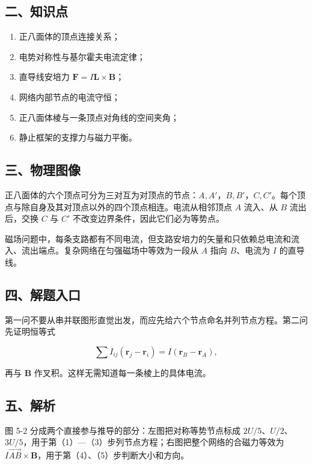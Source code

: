 \documentclass[12pt,a4paper,UTF8]{ctexart}
\newcommand{\tightlist}{\setlength{\itemsep}{0pt}\setlength{\parskip}{0pt}}
\begin{document}
\subsection{二、知识点}\label{ux4e8cux77e5ux8bc6ux70b9-4}

\begin{enumerate}
\def\labelenumi{\arabic{enumi}.}
\tightlist
\item
  正八面体的顶点连接关系；
\item
  电势对称性与基尔霍夫电流定律；
\item
  直导线安培力 \(\bm F=I\bm L\times\bm B\)；
\item
  网络内部节点的电流守恒；
\item
  正八面体棱与一条顶点对角线的空间夹角；
\item
  静止框架的支撑力与磁力平衡。
\end{enumerate}

\subsection{三、物理图像}\label{ux4e09ux7269ux7406ux56feux50cf-4}

正八面体的六个顶点可分为三对互为对顶点的节点：\(A,A'\)，\(B,B'\)，\(C,C'\)。每个顶点与除自身及其对顶点以外的四个顶点相连。电流从相邻顶点
\(A\) 流入、从 \(B\) 流出后，交换 \(C\) 与 \(C'\)
不改变边界条件，因此它们必为等势点。

磁场问题中，每条支路都有不同电流，但支路安培力的矢量和只依赖总电流和流入、流出端点。复杂网络在匀强磁场中等效为一段从
\(A\) 指向 \(B\)、电流为 \(I\) 的直导线。

\subsection{四、解题入口}\label{ux56dbux89e3ux9898ux5165ux53e3-4}

第一问不要从串并联图形直觉出发，而应先给六个节点命名并列节点方程。第二问先证明恒等式

\[
\sum I_{ij}(\bm r_j-\bm r_i)=I(\bm r_B-\bm r_A),
\]

再与 \(\bm B\) 作叉积。这样无需知道每一条棱上的具体电流。

\subsection{五、解析}\label{ux4e94ux89e3ux6790-4}

图 5-2 分成两个直接参与推导的部分：左图把对称等势节点标成
\(2U/5\)、\(U/2\)、\(3U/5\)，用于第（1）---（3）步列节点方程；右图把整个网络的合磁力等效为
\(I\overrightarrow{AB}\times\bm B\)，用于第（4）、（5）步判断大小和方向。
\end{document}
